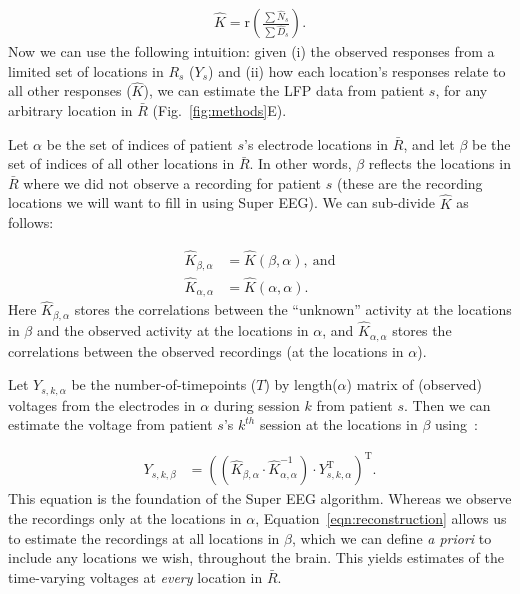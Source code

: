 \documentclass[12pt]{article}
\begin{document}
\begin{align}
 \hat{K} = \mathrm{r} \left (  \frac{\sum  \hat{N}_{s}}{\sum \hat{D}_{s}}\right ).\label{eqn:correlation_matrix}
\end{align}
Now we can use the following intuition: given (i) the observed
responses from a limited set of locations in $R_{s}$ ($Y_{s}$) and
(ii) how each location's responses relate to all other responses
($\hat{K}$), we can estimate the LFP data from patient
$s$, for any arbitrary location in $\bar{R}$
(Fig.~\ref{fig:methods}E).

Let $\alpha$ be the set of indices of patient $s$'s electrode locations in
$\bar{R}$, and let $\beta$ be the set of indices of all other
locations in $\bar{R}$. In other words, $\beta$ reflects the locations
in $\bar{R}$ where we did not observe a recording for patient $s$
(these are the recording locations we will want to fill in using Super EEG).
We can sub-divide $\hat{K}$ as follows:

\begin{align}
\hat{K}_{\beta,\alpha} &= \hat{K}(\beta,\alpha),~\mathrm{and}\label{eqn:Kba}\\
\hat{K}_{\alpha,\alpha} &= \hat{K}(\alpha,\alpha)\label{eqn:Kaa}.
\end{align}
Here $\hat{K}_{\beta, \alpha}$ stores the correlations between the
``unknown'' activity at the locations in $\beta$ and the observed
activity at the locations in $\alpha$, and $\hat{K}_{\alpha, \alpha}$
stores the correlations between the observed recordings (at the
locations in $\alpha$). 

Let $Y_{s,k,\alpha}$ be the number-of-timepoints
($T$) by length($\alpha$) matrix of (observed) voltages from the electrodes in $\alpha$ during session $k$ from patient $s$. Then we can estimate the voltage from patient $s$'s $k^{th}$ session at the locations in $\beta$ using~\cite{Rasm06}:

\begin{align}
Y_{s,k,\beta} &= ((\hat{K}_{\beta,\alpha}\cdot\hat{K}_{\alpha,\alpha}^{-1})\cdot Y_{s,k,\alpha}^\mathrm{T})^\mathrm{T}.\label{eqn:reconstruction}
\end{align}
This equation is the foundation of the Super EEG algorithm.  Whereas
we observe the recordings only at the locations in $\alpha$,
Equation~\ref{eqn:reconstruction} allows us to estimate the recordings
at all locations in $\beta$, which we can define \textit{a priori} to
include any locations we wish, throughout the brain.  This yields estimates of
the time-varying voltages at \textit{every} location in $\bar{R}$.
\end{document}
